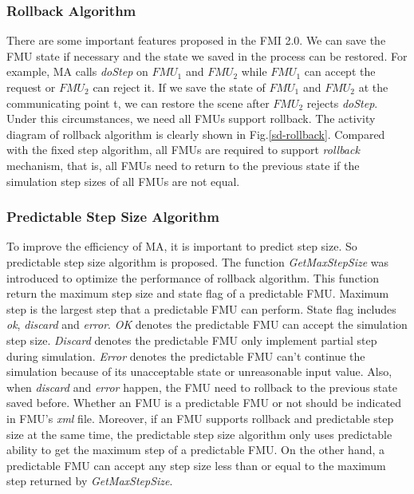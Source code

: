 \subsubsection{Rollback Algorithm}
There are some important features proposed in the FMI 2.0. We can save the FMU state if necessary and the state we saved in the process can be restored. For example, MA calls \emph{doStep} on $FMU_{1}$ and $FMU_{2}$ while $FMU_{1}$ can accept the request or $FMU_{2}$ can reject it. If we save the state of $FMU_{1}$ and $FMU_{2}$ at the communicating point \textrm{t}, we can restore the scene after $FMU_{2}$ rejects \emph{doStep}. Under this circumstances, we need all FMUs support rollback. The activity diagram of rollback algorithm is clearly shown in Fig.\ref{sd-rollback}. Compared with the fixed step algorithm, all FMUs are required to support \emph{rollback} mechanism, that is, all FMUs need to return to the previous state if the simulation step sizes of all FMUs are not equal.
\subsubsection{Predictable Step Size Algorithm}
To improve the efficiency of MA, it is important to predict step size. So predictable step size algorithm is proposed. The function \emph{GetMaxStepSize} was introduced to optimize the performance of rollback algorithm. This function return the maximum step size and state flag of a predictable FMU. Maximum step is the largest step that a predictable FMU can perform. State flag includes \emph{ok}, \emph{discard} and \emph{error}. \emph{OK} denotes the predictable FMU can accept the simulation step size. \emph{Discard} denotes the predictable FMU only implement partial step during simulation. \emph{Error} denotes the predictable FMU can't continue the simulation because of its unacceptable state or unreasonable input value. Also, when \emph{discard} and \emph{error} happen, the FMU need to rollback to the previous state saved before. Whether an FMU is a predictable FMU or not should be indicated in FMU's \emph{xml} file. Moreover, if an FMU supports rollback and predictable step size at the same time, the predictable step size algorithm only uses predictable ability to get the maximum step of a predictable FMU. On the other hand, a predictable FMU can accept any step size less than or equal to the maximum step returned by \emph{GetMaxStepSize}.

